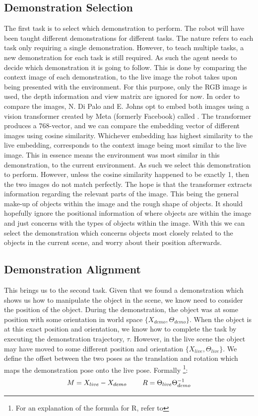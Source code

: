 \subsection{Demonstration Selection}
The first task is to select which demonstration to perform. The robot will have been taught different demonstrations for different tasks. The  nature refers to each task only requiring a single demonstration. However, to teach multiple tasks, a new demonstration for each task is still required. As such the agent needs to decide which demonstration it is going to follow. This is done by comparing the context image of each demonstration, to the live image the robot takes upon being presented with the environment. For this purpose, only the RGB image is used, the depth information and view matrix are ignored for now. In order to compare the images, N. Di Palo and E. Johns opt to embed both images using a vision transformer created by Meta (formerly Facebook) called  \cite{dino-paper}. The transformer produces a 768-vector, and we can compare the embedding vector of different images using cosine similarity. Whichever embedding has highest similarity to the live embedding, corresponds to the context image being most similar to the live image. This in essence means the environment was most similar in this demonstration, to the current environment. As such we select this demonstration to perform. However, unless the cosine similarity happened to be exactly 1, then the two images do not match perfectly. The hope is that the transformer extracts information regarding the relevant parts of the image. This being the general make-up of objects within the image and the rough shape of objects. It should hopefully ignore the positional information of where objects are within the image and just concerns with the types of objects within the image. With this we can select the demonstration which concerns objects most closely related to the objects in the current scene, and worry about their position afterwards.

\subsection{Demonstration Alignment}
\label{subsec:alignment}
This brings us to the second task. Given that we found a demonstration which shows us how to manipulate the object in the scene, we know need to consider the position of the object. During the demonstration, the object was at some position with some orientation in world space $\{X_{demo}, \Theta_{demo}\}$. When the object is at this exact position and orientation, we know how to complete the task by executing the demonstration trajectory, $\tau$. However, in the live scene the object may have moved to some different position and orientation $\{X_{live}, \Theta_{live}\}$. We define the offset between the two poses as the translation and rotation which maps the demonstration pose onto the live pose. Formally \footnote{For an explanation of the formula for R, refer to }:
$$M = X_{live} - X_{demo} \operatorname{\operatorname{\: \: \: \:} \operatorname{\: \: \: \:}} R = \Theta_{live} \Theta_{demo}^{-1}$$ 

